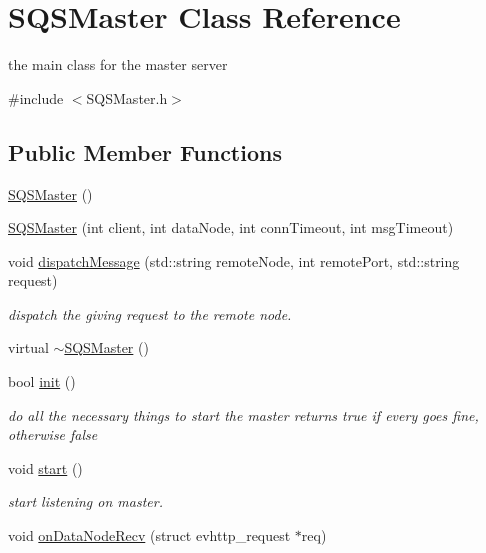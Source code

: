 \hypertarget{classSQSMaster}{\section{\-S\-Q\-S\-Master \-Class \-Reference}
\label{dc/d1b/classSQSMaster}
}


the main class for the master server  




{\ttfamily \#include $<$\-S\-Q\-S\-Master.\-h$>$}

\subsection*{\-Public \-Member \-Functions}
\begin{DoxyCompactItemize}
\item 
\hyperlink{classSQSMaster_aec053caf04055bce21d3d0d52e3c67f1}{\-S\-Q\-S\-Master} ()
\item 
\hyperlink{classSQSMaster_a156f1d02bf2e194994cc61ad084e8744}{\-S\-Q\-S\-Master} (int client, int data\-Node, int conn\-Timeout, int msg\-Timeout)
\item 
void \hyperlink{classSQSMaster_ac844442974f57fe16ab8ccdcffb7c0af}{dispatch\-Message} (std\-::string remote\-Node, int remote\-Port, std\-::string request)
\begin{DoxyCompactList}\small\item\em dispatch the giving request to the remote node. \end{DoxyCompactList}\item 
virtual \hyperlink{classSQSMaster_a5cea48538871c9ec2e329b3814961814}{$\sim$\-S\-Q\-S\-Master} ()
\item 
bool \hyperlink{classSQSMaster_aae86dc34884a4c5de5e9da57a2932040}{init} ()
\begin{DoxyCompactList}\small\item\em do all the necessary things to start the master returns true if every goes fine, otherwise false \end{DoxyCompactList}\item 
void \hyperlink{classSQSMaster_a77f66b138c351e508432458b764f218d}{start} ()
\begin{DoxyCompactList}\small\item\em start listening on master. \end{DoxyCompactList}\item 
void \hyperlink{classSQSMaster_a15fe36fa592546e0740e91bff9972fc2}{on\-Data\-Node\-Recv} (struct evhttp\-\_\-request $\ast$req)

\end{DoxyCompactItemize}

